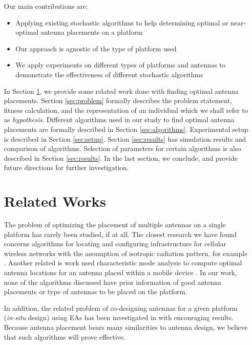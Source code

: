 \documentclass{sig-alternate}
\begin{document}
Our main contributions are:
\begin{itemize}
    \item Applying existing stochastic algorithms to help determining optimal or near-optimal antenna placements on a platform
    \item Our approach is agnostic of the type of platform used
    \item We apply experiments on different types of platforms and antennas to demonstrate the effectiveness of different stochastic algorithms
\end{itemize}

In Section \ref{sec:related}, we provide some related work done with finding optimal antenna placements. Section \ref{sec:problem} formally describes the problem statement, fitness calculation, and the representation of an individual which we shall refer to as \textit{hypothesis}. Different algorithms used in our study to find optimal antenna placements are formally described in Section \ref{sec:algorithms}. Experimental setup is described in Section \ref{sec:setup}. Section \ref{sec:results} has simulation results and comparison of algorithms. Selection of parameters for certain algorithms is also described in Section \ref{sec:results}. In the last section, we conclude, and provide future directions for further investigation.

\section{Related Works}
\label{sec:related}
The problem of optimizing the placement of multiple antennas on a single platform has rarely been studied, if at all.  The closest research we have found concerns algorithms for locating and configuring infrastructure  for cellular wireless networks with the assumption of isotropic radiation pattern, for example \cite{raisanen2005comparison}.  Another related is work used characteristic mode analysis to compute optimal antenna locations for an antenna placed within a mobile device \cite{rahola2006optimal, famdie2007optimal}. In our work, none of the algorithms discussed have prior information of good antenna placements or type of antennas to be placed on the platform.

In addition, the related problem of co-designing antennas for a given platform ({\em in-situ} design) using EAs has been investigated in \cite{linden2000wire} with encouraging results. Because antenna placement bears many similarities to antenna design, we believe that such algorithms will prove effective.
\end{document}
